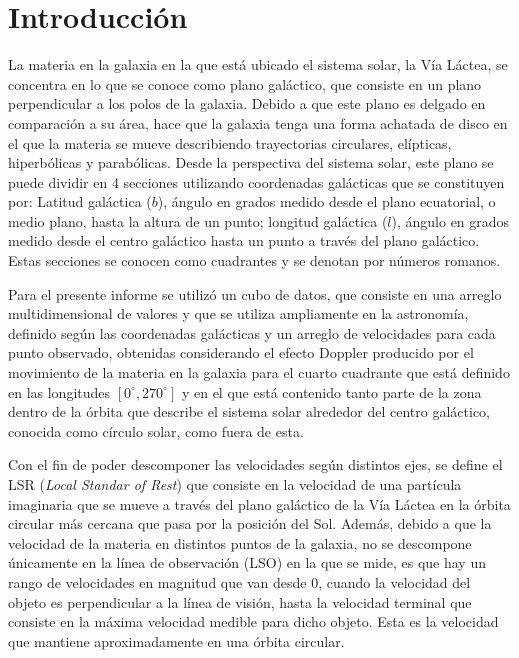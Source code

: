 \documentclass[letterpaper,oneside]{article}
\begin{document}
	
\templatePortrait

\templatePagecfg



\templateFinalcfg


\section{Introducción}
La materia en la galaxia en la que está ubicado el sistema solar, la Vía Láctea, se concentra en lo que se conoce como plano galáctico, que consiste en un plano perpendicular a los polos de la galaxia.  Debido a que este plano es delgado en comparación a su área, hace que la galaxia tenga una forma achatada de disco en el que la materia se mueve describiendo trayectorias circulares, elípticas, hiperbólicas y parabólicas.
Desde la perspectiva del sistema solar, este plano se puede dividir en 4 secciones utilizando coordenadas galácticas que se constituyen por: Latitud galáctica ($b$), ángulo en grados medido desde el plano ecuatorial, o medio plano, hasta la altura de un punto; longitud galáctica ($l$), ángulo  en grados medido desde el centro galáctico hasta un punto a través del plano galáctico. Estas secciones se conocen como cuadrantes y se denotan por números romanos.

Para el presente informe se utilizó un cubo de datos, que consiste en una arreglo multidimensional de valores y que se utiliza ampliamente en la astronomía, definido según las coordenadas galácticas y un arreglo de velocidades para cada punto observado, obtenidas considerando el efecto Doppler producido por el movimiento de la materia en la galaxia para el cuarto cuadrante que está definido en las longitudes $[ 0^{\circ}, 270^{\circ}]$ y en el que está contenido tanto parte de la zona dentro de la órbita que describe el sistema solar alrededor del centro galáctico, conocida como círculo solar, como fuera de esta.

Con el fin de poder descomponer las velocidades según distintos ejes, se define el LSR (\textit{Local Standar of Rest}) que consiste en la velocidad de una partícula imaginaria que se mueve a través del plano galáctico de la Vía Láctea en la órbita circular más cercana que pasa por la posición del Sol. Además, debido a que la velocidad de la materia en distintos puntos de la galaxia, no se descompone únicamente en la línea de observación (LSO) en la que se mide, es que hay un rango de velocidades en magnitud que van desde 0, cuando la velocidad del objeto es perpendicular a la línea de visión, hasta la velocidad terminal que consiste en la máxima velocidad medible para dicho objeto. Esta es la velocidad que mantiene aproximadamente en una órbita circular.
\end{document}
